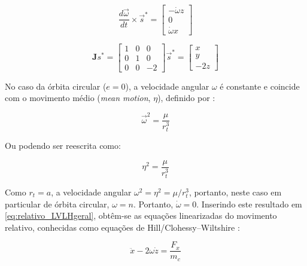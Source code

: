 \begin{equation}
\label{eq:dOmega_cross_s}
\frac{d\vec\omega}{dt} \times \vec s^*
=
\begin{bmatrix}
-\dot\omega z \\
0              \\
\dot\omega x
\end{bmatrix}
\end{equation}

\begin{equation}
\label{eq:jacobiana_LVLH}
\mathbf Js^*
=
\begin{bmatrix}
    1 & 0 & 0 \\
    0 & 1 & 0  \\
    0 & 0 & -2
\end{bmatrix}
\vec s^*
=
\begin{bmatrix}
x \\
y \\
-2z
\end{bmatrix}
\end{equation}

No caso da órbita circular ($e=0$), a velocidade angular
$\omega$ é constante e coincide com o movimento médio (\emph{mean motion}, $\eta$), definido por \cite{fehse2003}:

\begin{equation}
\label{eq:omega_constante1}
\vec\omega^2 = \frac{\mu}{r_t^3}
\end{equation}

Ou podendo ser reescrita como:

\begin{equation}
\label{eq:omega_constante2}
\eta^2 = \frac{\mu}{r_t^3}
\end{equation}

Como $r_t=a$, a velocidade angular $\omega^{2}= \eta^2 = \mu/r_t^{3}$, portanto, neste caso em particular de órbita circular, $\omega=n$.
Portanto, $\dot{\omega}=0$.
Inserindo este resultado em \eqref{eq:relativo_LVLHgeral}, obtêm-se as equações linearizadas do movimento relativo, conhecidas como equações de Hill/Clohessy--Wiltshire \cite{hill1878,fehse2003,wie2008space}:

\begin{equation}
    \label{eq:equacoes_HillX}
\ddot{x} - 2\omega \dot{z} = \frac{F_x}{m_c}
\end{equation}


